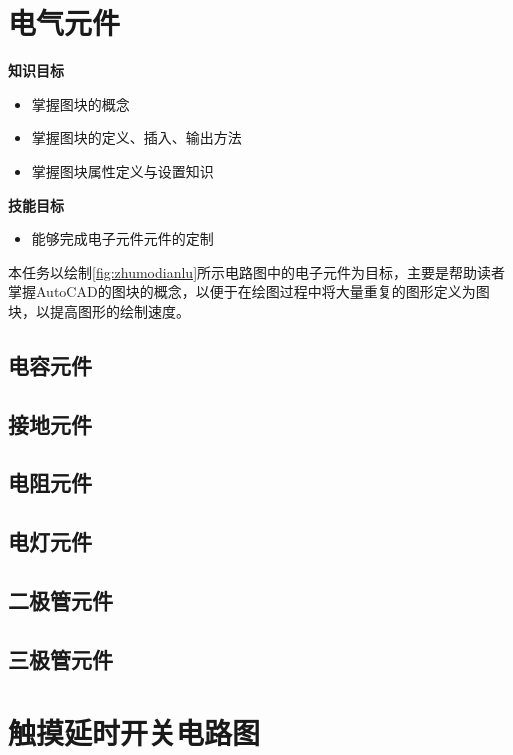 \section{电气元件}\label{sec:dianqiyuanjian}

{\bfseries 知识目标}
\begin{itemize}
\item 掌握图块的概念
\item 掌握图块的定义、插入、输出方法
\item 掌握图块属性定义与设置知识
\end{itemize}

{\bfseries 技能目标}
\begin{itemize}
\item 能够完成电子元件元件的定制
\end{itemize}

本任务以绘制\ref{fig:zhumodianlu}所示电路图中的电子元件为目标，主要是帮助读者掌握AutoCAD的图块的概念，以便于在绘图过程中将大量重复的图形定义为图块，以提高图形的绘制速度。

\subsection{电容元件}

\subsection{接地元件}

\subsection{电阻元件}

\subsection{电灯元件}

\subsection{二极管元件}

\subsection{三极管元件}

\section{触摸延时开关电路图}
\endinput
